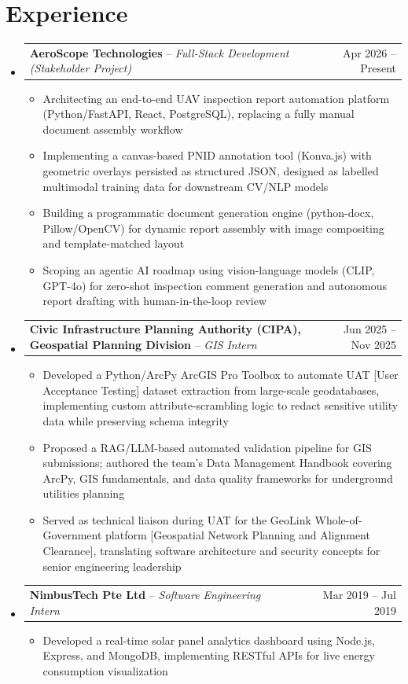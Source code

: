 \documentclass[letterpaper,10pt]{article}
\makeatletter
\newcommand{\resumeItem}[1]{\item\small{{#1\vspace{-3pt}}}}
\newcommand{\resumeExpHeading}[3]{
  \vspace{-1pt}\item
    \begin{tabular*}{0.98\textwidth}[t]{l@{\extracolsep{\fill}}r}
      \textbf{#1} -- \textit{#2} & {#3} \\
    \end{tabular*}\vspace{-5pt}
}
\newcommand{\resumeSubHeadingListStart}{\begin{itemize}[leftmargin=0.05in, rightmargin=0in, label={}]}
\newcommand{\resumeSubHeadingListEnd}{\end{itemize}}
\newcommand{\resumeItemListStart}{\begin{itemize}[leftmargin=0.15in, rightmargin=0.05in]\vspace{-2pt}}
\newcommand{\resumeItemListEnd}{\end{itemize}\vspace{-6pt}}
\makeatother
\begin{document}
\section{Experience}
  \resumeSubHeadingListStart
    \resumeExpHeading{AeroScope Technologies}{Full-Stack Development (Stakeholder Project)}{Apr 2026 -- Present}
      \resumeItemListStart
        \resumeItem{Architecting an end-to-end UAV inspection report automation platform (Python/FastAPI, React, PostgreSQL), replacing a fully manual document assembly workflow}
        \resumeItem{Implementing a canvas-based PNID annotation tool (Konva.js) with geometric overlays persisted as structured JSON, designed as labelled multimodal training data for downstream CV/NLP models}
        \resumeItem{Building a programmatic document generation engine (python-docx, Pillow/OpenCV) for dynamic report assembly with image compositing and template-matched layout}
        \resumeItem{Scoping an agentic AI roadmap using vision-language models (CLIP, GPT-4o) for zero-shot inspection comment generation and autonomous report drafting with human-in-the-loop review}
      \resumeItemListEnd

    \resumeExpHeading{Civic Infrastructure Planning Authority (CIPA), Geospatial Planning Division}{GIS Intern}{Jun 2025 -- Nov 2025}
      \resumeItemListStart
        \resumeItem{Developed a Python/ArcPy ArcGIS Pro Toolbox to automate UAT [User Acceptance Testing] dataset extraction from large-scale geodatabases, implementing custom attribute-scrambling logic to redact sensitive utility data while preserving schema integrity}
        \resumeItem{Proposed a RAG/LLM-based automated validation pipeline for GIS submissions; authored the team's Data Management Handbook covering ArcPy, GIS fundamentals, and data quality frameworks for underground utilities planning}
        \resumeItem{Served as technical liaison during UAT for the GeoLink Whole-of-Government platform [Geospatial Network Planning and Alignment Clearance], translating software architecture and security concepts for senior engineering leadership}
      \resumeItemListEnd

    \resumeExpHeading{NimbusTech Pte Ltd}{Software Engineering Intern}{Mar 2019 -- Jul 2019}
      \resumeItemListStart
        \resumeItem{Developed a real-time solar panel analytics dashboard using Node.js, Express, and MongoDB, implementing RESTful APIs for live energy consumption visualization}
      \resumeItemListEnd

  \resumeSubHeadingListEnd
\end{document}
